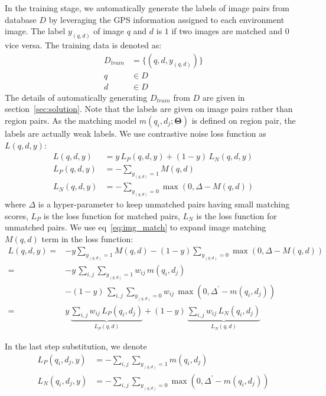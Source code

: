 In the training stage, we automatically generate the labels of image pairs from database $D$ by leveraging the GPS information assigned to each environment image. 
The label $y_{(q, d)}$ of image $q$ and $d$ is $1$ if two images are matched and $0$ vice versa. 
The training data is denoted as: 
\begin{align}
D_{train} &= \{(q, d, y_{(q, d)})\}\\
q &\in D \nonumber \\
d &\in D \nonumber
\end{align}
The details of automatically generating $D_{train}$ from $D$ are given in section~\ref{sec:solution}. 
Note that the labels are given on image pairs rather than region pairs. 
As the matching model $m(q_i, d_j; \mathbf{\Theta})$ is defined on region pair, the labels are actually weak labels. 
We use contrastive noise loss function as $L(q, d, y)$:
\begin{equation}
\label{eq:img_loss}
\begin{aligned}
L(q, d, y) &= y\, L_P(q, d, y) + (1-y)\, L_N(q, d, y) \\
L_P(q, d, y) &= -\sum_{y_{(q, d)}=1} M(q, d)\\
L_N(q, d, y) &= -\sum_{y_{(q, d)}=0} \max(0, \Delta-M(q,d))
\end{aligned}
\end{equation}
where $\Delta$ is a hyper-parameter to keep unmatched pairs having small matching scores, $L_P$ is the loss function for matched pairs, $L_N$ is the loss function for unmatched pairs. 
We use eq~\eqref{eq:img_match} to expand image matching $M(q, d)$ term in the loss function: 
\begin{equation}
\label{eq:correspondence}
\begin{aligned}
L(q, d, y) = &-y\sum_{y_{(q, d)}=1} M(q, d) - (1-y) \sum_{y_{(q, d)}=0} \max(0, \Delta - M(q, d))\\
= & -y\, \sum_{i, j}\sum_{y_{(q, d)}=1} w_{ij}\, m(q_i, d_j) \\
 &- (1-y)\, \sum_{i, j}\sum_{y_{(q, d)}=0} w_{ij}\, \max(0, \Delta^{'} - m(q_i, d_j))\\
= & y\, \underbrace{\sum_{i, j} w_{ij}\, L_P(q_i, d_j)}_{L_P(q, d)} + (1-y)\, \underbrace{\sum_{i,j} w_{ij}\, L_N(q_i, d_j)}_{L_N(q, d)}
\end{aligned}
\end{equation}

In the last step substitution, we denote
\begin{equation}
\label{eq:region_loss}
\begin{aligned}
L_P(q_i, d_j, y) &= -\sum_{i,j}\sum_{y_{(q, d)}=1} m(q_i, d_j)\\
L_N(q_i, d_j, y) &= -\sum_{i,j}\sum_{y_{(q, d)}=0} \max(0, \Delta^{'} - m(q_i, d_j))
\end{aligned}
\end{equation}


